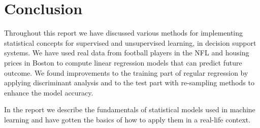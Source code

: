 



\chapter{Conclusion} \label{ch:conclussion}
Throughout this report we have discussed various methods for implementing statistical concepts for supervised and unsupervised learning, in decision support systems. We have used real data from football players in the NFL and housing prices in Boston to compute linear regression models that can predict future outcome. We found improvements to the training part of regular regression by applying discriminant analysis and to the test part with re-sampling methods to enhance the model accuracy.

In the report we describe the fundamentals of statistical models used in machine learning and have gotten the basics of how to apply them in a real-life context.